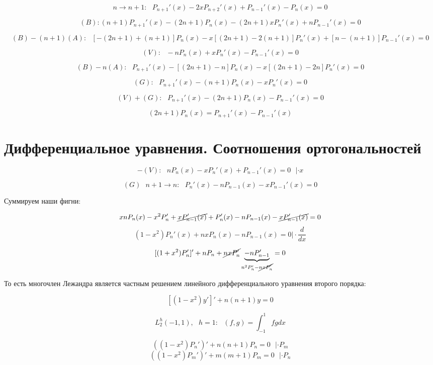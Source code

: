 \documentclass[12pt, a4paper]{report}
\begin{document}
\[ n \to  n+1 : \text{ }P_{n +1 } '(x ) -2 x P_{n+2  } ' (x ) + P_{n-1 } ' (x ) - P_{n} (x ) =0   \] 

\[ (B) : (n+1 ) P_{n+1 } ' (x ) - (2 n + 1 ) P_n (x ) - (2n + 1 ) xP_n '(x ) + n P_{n-1 }  ' (x ) = 0 \] 

\[ (B ) - (n +1 )(A ) : \text{ }   [- (2n +1 )+ (n+1 )] P_n(x ) - x [(2 n +1 )-2 ( n+1 )]P_n '(x ) + [n - (n+1 )]P_{n-1 } '(x) = 0\] 

\[ (V): \text{ } - n P_n(x ) + x P_n '( x ) - P_{n-1 }  '(x ) = 0 \] 

\[ (B ) - n (A ) : \text{ }  P_{n +1 }  ' ( x ) - [ ( 2 n+ 1 ) - n ] P_n  ( x ) - x [(2 n +1 ) - 2n ] P_n ' (x ) = 0 \] 

\[ (G): \text{ }  P_{n+1 }  '( x )  -(n +1 ) P_n (x ) - x P_n ' (x ) =0 \] 

\[ (V )+ (G ) : \text{ }  P_{n+1 } '( x ) - (2 n +1 ) P_n (x ) - P_{n -1 }  ' ( x ) =0 \] 

\[ (2 n+ 1 )    P_n ( x ) = P_{n+1  }  '(x ) - P_{n-1 }  ' (x ) \] 

\section{Дифференциальное уравнения. Соотношения ортогональностей }

\[  - (V )  :\text{ } n P_n(x ) - x P_n ' (x ) + P_{n-1 } '(x )= 0 \text{ } | \cdot x   \] 

\[ (G ) \text{ }  n+1 \to  n : \text{ }  P_n '(x ) - n P_{n -1 } (x ) - x P_{n-1 }  '(x ) =0  \] 

Суммируем наши фигни: 

\[ xn P_n(x ) - x  ^2 P_n ' +\cancel{ x P_{n-1 } ' (x )} + P_{n }  ' (x ) - n P_{n-1 }  (x) - \cancel{ x P_{n-1 } ' (x )} =0\] 
\[ (1- x ^2 ) P_n' (x ) + n x P_n (x )- n P_{n-1 }  (x ) =0 \bigg| \cdot \frac{d}{dx} \] 

\[ [(1 + x ^2 )P_n ' ]' + n P_n +\cancel{nx P_n '} \underbrace{- n P_{n-1 } ' }_{n ^2 P_n ' - \cancel{nx P_n '}} =0  \] 

То есть многочлен Лежандра является частным решением линейного дифференциального уравнения второго порядка: 

\[ [(1 - x ^2 )y '  ] ' + n (n+1 ) y = 0 \] 

\[ L_2 ^ h (-1 ,1 ) , \text{ }  h=1 : \text{ }  (f, g ) = \int_{-1 }^{1 }  fg dx  \]  

\[ ((1 -x ^2 )P_n ') ' + n (n+1 ) P_n =0  \text{ } | \cdot P_m  \] 
\[ ((1- x ^2 ) P_m ' ) ' +m (m +1 ) P_m = 0 \text{ } | \cdot P_n  \] 
\end{document}
